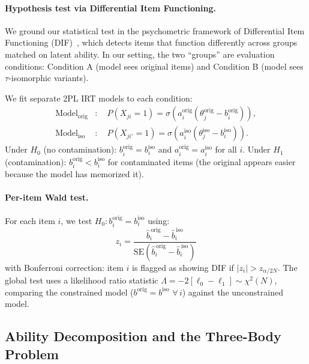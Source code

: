 \paragraph{Hypothesis test via Differential Item Functioning.}
We ground our statistical test in the psychometric framework of
Differential Item Functioning (DIF)~\cite{lord1980,holland1993},
which detects items that function differently across groups matched on
latent ability. In our setting, the two ``groups'' are evaluation
conditions: Condition A (model sees original items) and Condition B
(model sees $\tau$-isomorphic variants).

We fit separate 2PL IRT models to each condition:
\begin{align}
\text{Model}_{\mathrm{orig}}&: \quad
P(X_{ji} = 1) = \sigma\!\left(a_i^{\mathrm{orig}}
(\theta_j^{\mathrm{orig}} - b_i^{\mathrm{orig}})\right),
\label{eq:irt_orig}
\\
\text{Model}_{\mathrm{iso}}&: \quad
P(X_{ji'} = 1) = \sigma\!\left(a_i^{\mathrm{iso}}
(\theta_j^{\mathrm{iso}} - b_i^{\mathrm{iso}})\right).
\label{eq:irt_iso}
\end{align}
Under $H_0$ (no contamination):
$b_i^{\mathrm{orig}} = b_i^{\mathrm{iso}}$ and
$a_i^{\mathrm{orig}} = a_i^{\mathrm{iso}}$ for all $i$.
Under $H_1$ (contamination): $b_i^{\mathrm{orig}} <
b_i^{\mathrm{iso}}$ for contaminated items (the original appears
easier because the model has memorized it).

\paragraph{Per-item Wald test.}
For each item $i$, we test $H_0 : b_i^{\mathrm{orig}} =
b_i^{\mathrm{iso}}$ using:
\begin{equation}
z_i = \frac{\hat{b}_i^{\,\mathrm{orig}} -
\hat{b}_i^{\,\mathrm{iso}}}
{\mathrm{SE}(\hat{b}_i^{\,\mathrm{orig}} -
\hat{b}_i^{\,\mathrm{iso}})}
\label{eq:wald}
\end{equation}
with Bonferroni correction: item $i$ is flagged as showing DIF if
$|z_i| > z_{\alpha / 2N}$. The global test uses a likelihood ratio
statistic $\Lambda = -2[\ell_0 - \ell_1] \sim \chi^2(N)$, comparing
the constrained model ($b^{\mathrm{orig}} = b^{\mathrm{iso}}$
$\forall\, i$) against the unconstrained model.


\subsection{Ability Decomposition and the Three-Body Problem}
\label{sec:threebody}

